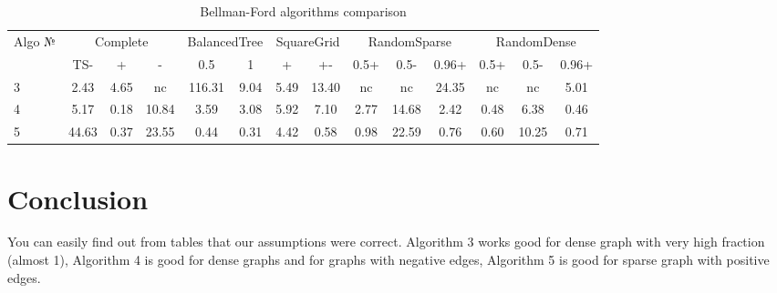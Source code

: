\begin{table}[H]
\centering

\begin{tabular}{l|ccc|cc|cc|ccc|ccc}  
Algo №& \multicolumn{3}{c}{Complete} & \multicolumn{2}{c}{BalancedTree} & \multicolumn{2}{c}{SquareGrid} & \multicolumn{3}{c}{RandomSparse} & \multicolumn{3}{c}{RandomDense}\\
& TS- & + & - & 0.5 & 1 & + & +- & 0.5+  & 0.5- & 0.96+ & 0.5+ & 0.5- & 0.96+\\
\hline\hline
3 & 2.43 & 4.65 & nc & 116.31 & 9.04 & 5.49 & 13.40 & nc & nc & 24.35 & nc & nc & 5.01 \\  
4 & 5.17 & 0.18 & 10.84 & 3.59 & 3.08 & 5.92 & 7.10 & 2.77 & 14.68 & 2.42 & 0.48  & 6.38  & 0.46 \\
5 & 44.63 & 0.37 & 23.55 & 0.44 & 0.31 & 4.42 & 0.58 & 0.98 & 22.59 & 0.76  & 0.60  & 10.25 & 0.71 \\
\hline
\end{tabular}

\caption{Bellman-Ford algorithms comparison}
\label{graph_description}
\end{table}

\FloatBarrier
\section{Conclusion}

You can easily find out from tables that our assumptions were correct. Algorithm 3 works good for dense graph with very high fraction (almost 1), Algorithm 4 is good for dense graphs and for graphs with negative edges, Algorithm 5 is good for sparse graph with positive edges. 

\FloatBarrier
